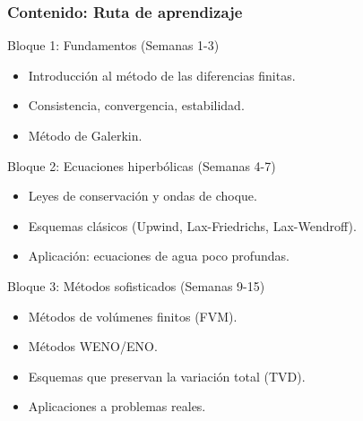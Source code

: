 \begin{frame}
	\frametitle{Contenido: Ruta de aprendizaje}

	\begin{block}{Bloque 1: Fundamentos (Semanas 1-3)}
		\begin{itemize}
			\item Introducción al método de las diferencias finitas.
			\item Consistencia, convergencia, estabilidad.
			\item Método de Galerkin.
		\end{itemize}
	\end{block}

	\begin{block}{Bloque 2: Ecuaciones hiperbólicas (Semanas 4-7)}
		\begin{itemize}
			\item Leyes de conservación y ondas de choque.
			\item Esquemas clásicos (Upwind, Lax-Friedrichs, Lax-Wendroff).
			\item Aplicación: ecuaciones de agua poco profundas.
		\end{itemize}
	\end{block}

	\begin{block}{Bloque 3: Métodos sofisticados (Semanas 9-15)}
		\begin{itemize}
			\item Métodos de volúmenes finitos (FVM).
			\item Métodos WENO/ENO.
			\item Esquemas que preservan la variación total (TVD).
			\item Aplicaciones a problemas reales.
		\end{itemize}
	\end{block}
\end{frame}

